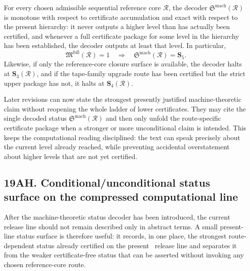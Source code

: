 \begin{proposition}
For every chosen admissible sequential reference core \(\mathcal R\), the decoder \(\mathfrak S^{\mathrm{mach}}(\mathcal R)\) is monotone with respect to certificate accumulation and exact with respect to the present hierarchy: it never outputs a higher level than has actually been certified, and whenever a full certificate package for some level in the hierarchy has been established, the decoder outputs at least that level. In particular,
\[
\mathfrak M^{\mathrm{full}}(\mathcal R)=1
\quad\Longrightarrow\quad
\mathfrak S^{\mathrm{mach}}(\mathcal R)=\mathbf S_5.
\]
Likewise, if only the reference-core closure surface is available, the decoder halts at \(\mathbf S_3(\mathcal R)\), and if the tape-family upgrade route has been certified but the strict upper package has not, it halts at \(\mathbf S_4(\mathcal R)\).
\end{proposition}

\begin{corollary}
Later revisions can now state the strongest presently justified machine-theoretic claim without reopening the whole ladder of lower certificates. They may cite the single decoded status \(\mathfrak S^{\mathrm{mach}}(\mathcal R)\) and then only unfold the route-specific certificate package when a stronger or more unconditional claim is intended. This keeps the computational reading disciplined: the text can speak precisely about the current level already reached, while preventing accidental overstatement about higher levels that are not yet certified.

\end{corollary}


\subsection*{19AH. Conditional/unconditional status surface on the compressed computational line}
After the machine-theoretic status decoder has been introduced, the current release line should not remain described only in abstract terms. A small present-line status surface is therefore useful: it records, in one place, the strongest route-dependent status already certified on the present \docversion\ release line and separates it from the weaker certificate-free status that can be asserted without invoking any chosen reference-core route.

